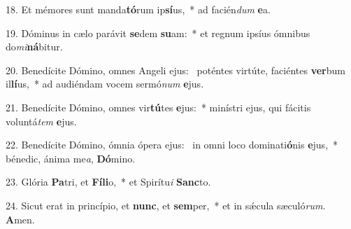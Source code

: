 18. Et mémores sunt manda\textbf{tó}rum ip\textbf{sí}us,~*  ad facién\textit{dum} \textbf{e}a.\

19. Dóminus in cælo parávit \textbf{se}dem \textbf{su}am:~*  et regnum ipsíus ómnibus do\textit{mi}\textbf{ná}bitur.\

20. Benedícite Dómino, omnes Angeli ejus: \dag\  poténtes virtúte, faciéntes \textbf{ver}bum il\textbf{lí}us,~*  ad audiéndam vocem sermó\textit{num} \textbf{e}jus.\

21. Benedícite Dómino, omnes vir\textbf{tú}tes \textbf{e}jus:~*  minístri ejus, qui fácitis voluntá\textit{tem} \textbf{e}jus.\

22. Benedícite Dómino, ómnia ópera ejus: \dag\  in omni loco dominati\textbf{ó}nis \textbf{e}jus,~*  bénedic, ánima me\textit{a}, \textbf{Dó}mino.\

23. Glória \textbf{Pa}tri, et \textbf{Fí}\textbf{li}o,~*  et Spirítu\textit{i} \textbf{Sanc}to.\

24. Sicut erat in princípio, et \textbf{nunc}, et \textbf{sem}per,~*  et in sǽcula sæculó\textit{rum}. \textbf{A}men.\

